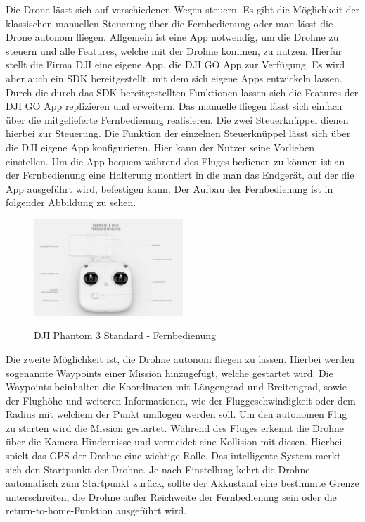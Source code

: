 Die Drone lässt sich auf verschiedenen Wegen steuern. Es gibt die Möglichkeit der klassischen manuellen Steuerung über die Fernbedienung oder man lässt die Drone autonom fliegen. 
\newline
Allgemein ist eine App notwendig, um die Drohne zu steuern und alle Features, welche mit der Drohne kommen, zu nutzen. Hierfür stellt die Firma DJI eine eigene App, die DJI GO App zur Verfügung. Es wird aber auch ein \acf{SDK} bereitgestellt, mit dem sich eigene Apps entwickeln lassen. Durch die durch das \acl{SDK} bereitgestellten Funktionen lassen sich die Features der DJI GO App replizieren und erweitern.
\newline
Das manuelle fliegen lässt sich einfach über die mitgelieferte Fernbedienung realisieren. Die zwei Steuerknüppel dienen hierbei zur Steuerung. Die Funktion der einzelnen Steuerknüppel lässt sich über die DJI eigene App konfigurieren. Hier kann der Nutzer seine Vorlieben einstellen. 
\newline
Um die App bequem während des Fluges bedienen zu können ist an der Fernbedienung eine Halterung montiert in die man das Endgerät, auf der die App ausgeführt wird, befestigen kann. 
\newline
Der Aufbau der Fernbedienung ist in folgender Abbildung zu sehen.
\begin{figure}[H]
	\begin{center}
		{\includegraphics[width=0.5\textwidth]{images/DJI_Fernbedienung.png}}
		\caption{DJI Phantom 3 Standard - Fernbedienung \cite{DJI.Phantom3}}
	\end{center}
\end{figure}
Die zweite Möglichkeit ist, die Drohne autonom fliegen zu lassen. Hierbei werden sogenannte Waypoints einer Mission hinzugefügt, welche gestartet wird. Die Waypoints beinhalten die Koordinaten mit Längengrad und Breitengrad, sowie der Flughöhe und weiteren Informationen, wie der Fluggeschwindigkeit oder dem Radius mit welchem der Punkt umflogen werden soll. Um den autonomen Flug zu starten wird die Mission gestartet. Während des Fluges erkennt die Drohne über die Kamera Hindernisse und vermeidet eine Kollision mit diesen. 
\newline
Hierbei spielt das \acf{GPS} der Drohne eine wichtige Rolle. Das intelligente System merkt sich den Startpunkt der Drohne. Je nach Einstellung kehrt die Drohne automatisch zum Startpunkt zurück, sollte der Akkustand eine bestimmte Grenze unterschreiten, die Drohne außer Reichweite der Fernbedienung sein oder die return-to-home-Funktion ausgeführt wird.

